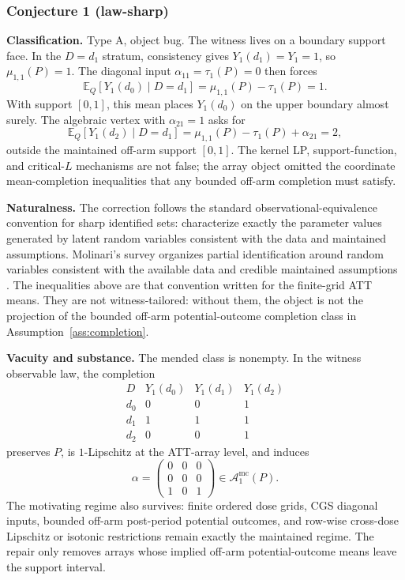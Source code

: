 \documentclass[11pt]{article}
\newcommand{\E}{\mathbb{E}}
\theoremstyle{definition}
\theoremstyle{plain}
\theoremstyle{remark}
\begin{document}
\subsubsection*{Conjecture 1 (law-sharp)}
\textbf{Classification.} Type A, object bug.  The witness lives on a boundary
support face.  In the \(D=d_1\) stratum, consistency gives
\(Y_1(d_1)=Y_1=1\), so
\(\mu_{1,1}(P)=1\).  The diagonal input \(\alpha_{11}=\tau_1(P)=0\) then
forces
\[
  \E_Q[Y_1(d_0)\mid D=d_1]
  =
  \mu_{1,1}(P)-\tau_1(P)
  =
  1.
\]
With support \([0,1]\), this mean places \(Y_1(d_0)\) on the upper boundary
almost surely.  The algebraic vertex with \(\alpha_{21}=1\) asks for
\[
  \E_Q[Y_1(d_2)\mid D=d_1]
  =
  \mu_{1,1}(P)-\tau_1(P)+\alpha_{21}
  =
  2,
\]
outside the maintained off-arm support \([0,1]\).  The kernel LP,
support-function, and critical-\(L\) mechanisms are not false; the array object
omitted the coordinate mean-completion inequalities that any bounded off-arm
completion must satisfy.

\textbf{Naturalness.} The correction follows the standard
observational-equivalence convention for sharp identified sets: characterize
exactly the parameter values generated by latent random variables consistent
with the data and maintained assumptions.  Molinari's survey organizes partial
identification around random variables consistent with the available data and
credible maintained assumptions \cite{Molinari2020}.  The inequalities above
are that convention written for the finite-grid ATT means.  They are not
witness-tailored: without them, the object is not the projection of the
bounded off-arm potential-outcome completion class in
Assumption~\ref{ass:completion}.

\textbf{Vacuity and substance.} The mended class is nonempty.  In the witness
observable law, the completion
\[
\begin{array}{c|ccc}
  D & Y_1(d_0) & Y_1(d_1) & Y_1(d_2)\\ \hline
  d_0 & 0&0&1\\
  d_1 & 1&1&1\\
  d_2 & 0&0&1
\end{array}
\]
preserves \(P\), is \(1\)-Lipschitz at the ATT-array level, and induces
\[
  \alpha=
  \begin{pmatrix}
    0&0&0\\
    0&0&0\\
    1&0&1
  \end{pmatrix}
  \in\mathcal A_1^{\mathrm{mc}}(P).
\]
The motivating regime also survives: finite ordered dose grids, CGS diagonal
inputs, bounded off-arm post-period potential outcomes, and row-wise cross-dose
Lipschitz or isotonic restrictions remain exactly the maintained regime.  The
repair only removes arrays whose implied off-arm potential-outcome means leave
the support interval.
\end{document}
